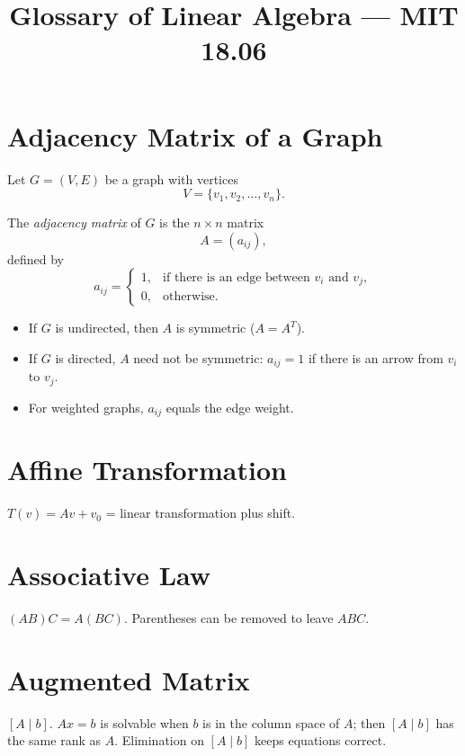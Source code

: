 \documentclass[12pt]{book}
\begin{document}
\frontmatter
\title{Glossary of Linear Algebra --- MIT 18.06}
\author{}
\date{}
\maketitle

\tableofcontents

\mainmatter

\chapter{Adjacency Matrix of a Graph}
Let $G = (V,E)$ be a graph with vertices
\[
V = \{v_1, v_2, \dots, v_n\}.
\]

The \emph{adjacency matrix} of $G$ is the $n \times n$ matrix
\[
A = (a_{ij}),
\]
defined by
\[
a_{ij} =
\begin{cases}
1, & \text{if there is an edge between } v_i \text{ and } v_j, \\
0, & \text{otherwise}.
\end{cases}
\]

\begin{itemize}
  \item If $G$ is undirected, then $A$ is symmetric ($A = A^T$).
  \item If $G$ is directed, $A$ need not be symmetric: $a_{ij}=1$ if there is an arrow from $v_i$ to $v_j$.
  \item For weighted graphs, $a_{ij}$ equals the edge weight.
\end{itemize}



\chapter{Affine Transformation}
$T(v) = Av + v_0$ = linear transformation plus shift.

\chapter{Associative Law}
$(AB)C = A(BC)$. Parentheses can be removed to leave $ABC$.

\chapter{Augmented Matrix}
$[A \mid b]$. $Ax = b$ is solvable when $b$ is in the column space of $A$; then $[A \mid b]$ has the same rank as $A$. Elimination on $[A \mid b]$ keeps equations correct.
\end{document}
